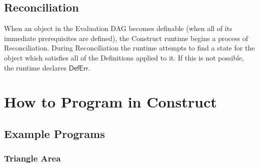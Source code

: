 \documentclass[11pt]{report}
\begin{document}
\section{Reconciliation}
\label{sec:reconc}

When an object in the Evaluation DAG becomes definable (when all of its immediate prerequisites are defined), the Construct runtime begins a process of Reconciliation. 
During Reconciliation the runtime attempts to find a state for the object which satisfies all of the Definitions applied to it. 
If this is not possible, the runtime declares $\mathsf{DefErr}$.

\chapter{How to Program in Construct}
\label{chap:howto}

\section{Example Programs}
\label{sec:example}

\subsection{Triangle Area}
\label{subsec:triarea}
\end{document}
